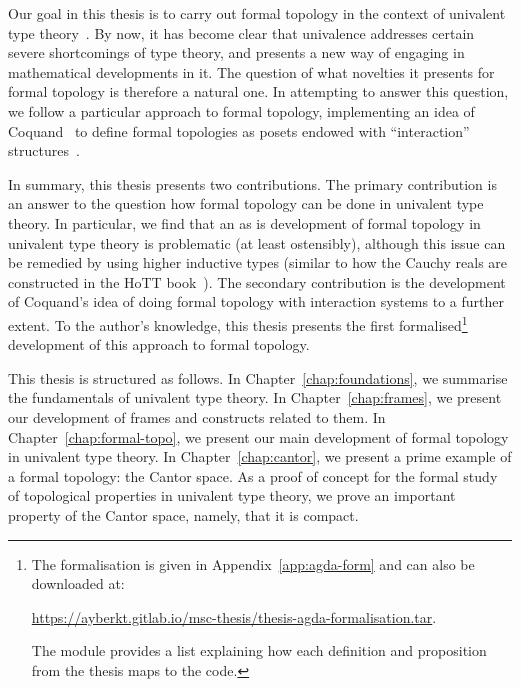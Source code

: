 Our goal in this thesis is to carry out formal topology in the context of univalent type
theory~\cite{hottbook, escardo-uf-intro}. By now, it has become clear that univalence
addresses certain severe shortcomings of type theory, and presents a new way of engaging
in mathematical developments in it. The question of what novelties it presents for formal
topology is therefore a natural one. In attempting to answer this question, we follow a
particular approach to formal topology, implementing an idea of Coquand~\cite{coq-posets}
to define formal topologies as posets endowed with ``interaction''
structures~\cite{tree-sets, hancock-interaction-systems}.

In summary, this thesis presents two contributions. The primary contribution is an answer
to the question how formal topology can be done in univalent type theory. In particular,
we find that an as is development of formal topology in univalent type theory is
problematic (at least ostensibly), although this issue can be remedied by using higher
inductive types (similar to how the Cauchy reals are constructed in the HoTT
book~\cite{hottbook}). The secondary contribution is the development of Coquand's idea of
doing formal topology with interaction systems to a further extent. To the author's
knowledge, this thesis presents the first formalised\footnote{%
  The \veragda{} formalisation is given in Appendix~\ref{app:agda-form} and can also be
  downloaded at:
  \begin{center}
    \url{https://ayberkt.gitlab.io/msc-thesis/thesis-agda-formalisation.tar}.
  \end{center}
  The  module provides a list explaining how each definition and
  proposition from the thesis maps to the \veragda{} code.
}%
development of this approach to formal topology.

This thesis is structured as follows. In Chapter~\ref{chap:foundations}, we summarise the
fundamentals of univalent type theory. In Chapter~\ref{chap:frames}, we present our
development of frames and constructs related to them. In Chapter~\ref{chap:formal-topo},
we present our main development of formal topology in univalent type theory. In
Chapter~\ref{chap:cantor}, we present a prime example of a formal topology: the Cantor
space. As a proof of concept for the formal study of topological properties in univalent
type theory, we prove an important property of the Cantor space, namely, that it is
compact.
